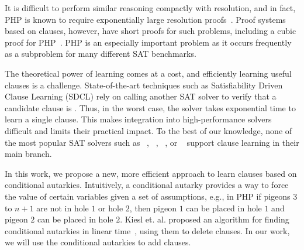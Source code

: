 It is difficult to perform similar reasoning compactly with resolution, and in
fact, PHP is known to require exponentially large resolution
proofs~\cite{hakenpigeonhole,mutilatedchessboard-exponential}. Proof systems
based on \pr clauses, however, have short proofs for such problems, including a
cubic proof for PHP~\cite{prclauses}. PHP is an especially important
problem as it occurs frequently as a subproblem for many different SAT
benchmarks.

The theoretical power of \pr learning comes at a cost, and efficiently learning
useful \pr clauses is a challenge. State-of-the-art techniques such as
Satisfiability Driven Clause Learning (SDCL) rely on calling another SAT solver
to verify that a candidate clause is \pr \cite{sadical}. 
Thus, in the worst case, the solver takes exponential time to learn a single \pr
clause. This makes integration into high-performance solvers difficult and
limits their practical impact. To the best of our knowledge, none of the most popular SAT solvers
such as \cadical~\cite{cadical}, \kissat~\cite{kissat},
\cryptoMiniSAT~\cite{cryptominisat}, or \lingeling~\cite{lingeling} support
\pr clause learning in their main branch.

In this work, we propose a new, more efficient approach to learn \pr clauses
based on conditional autarkies. Intuitively, a conditional autarky provides a
way to force the value of certain variables given a set of assumptions, e.g., in
PHP if pigeons $3 $ to $ n+1$ are not in hole $1$ or hole $2$, then pigeon $1$
can be placed in hole $1$ and pigeon $2$ can be placed in hole $2$. Kiesl et.
al. proposed an algorithm for finding conditional autarkies in linear
time~\cite{conditionalautarkies}, using them to delete clauses. In our work, we
will use the conditional autarkies to add \pr clauses. 
%

